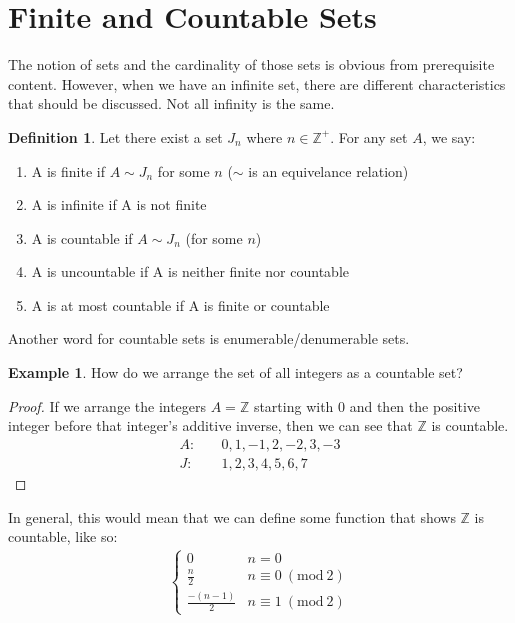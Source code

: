 \documentclass[14pt]{extarticle}
\theoremstyle{definition}
\newtheorem{definition}{Definition}[section]
\newtheorem{example}{Example}[section]
\newcommand{\Mod}[1]{\ (\mathrm{mod}\ #1)}
\begin{document}
\pagebreak

\section{Finite and Countable Sets}
The notion of sets and the cardinality of those sets is obvious from prerequisite content. However, when we have an infinite set,
there are different characteristics that should be discussed. Not all infinity is the same. 

\begin{definition}
    Let there exist a set $J_n$ where $n\in \mathbb{Z}^+$. For any set $A$, we say:
    \begin{enumerate}[label=(\alph*)]
        \item A is finite if $A \sim J_n$ for some $n$ ($\sim$ is an equivelance relation)
        \item A is infinite if A is not finite
        \item A is countable if $A\sim J_n$ (for some $n$)
        \item A is uncountable if A is neither finite nor countable
        \item A is at most countable if A is finite or countable
    \end{enumerate}
\end{definition}

\noindent
Another word for countable sets is enumerable/denumerable sets.

\begin{example}
    How do we arrange the set of all integers as a countable set?

    \begin{proof} If we arrange the integers $A = \mathbb{Z}$ starting with 0 and then the positive
        integer before that integer's additive inverse, then we can see that $\mathbb{Z}$ is countable.
        \begin{align*}
            A:\quad &0, 1, -1, 2, -2, 3, -3\\
            J:\quad &1, 2, 3, 4, 5, 6, 7
        \end{align*}
    \end{proof}
    In general, this would mean that we can define some function that shows $\mathbb{Z}$ is countable, like so:
    \begin{align*}
        \begin{cases}
            0 & n = 0\\
            \frac{n}{2} & n\equiv 0 \Mod{2}\\
            \frac{-(n-1)}{2} & n\equiv 1 \Mod{2}
        \end{cases}
    \end{align*}
\end{example}
\end{document}
